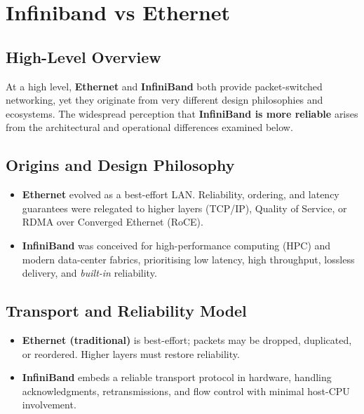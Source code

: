 \section{Infiniband vs Ethernet}

 
 
 \subsection{High-Level Overview}
At a high level, \textbf{Ethernet} and \textbf{InfiniBand} both provide
packet-switched networking, yet they originate from very different
design philosophies and ecosystems.  The widespread perception that
\textbf{InfiniBand is more reliable} arises from the architectural and
operational differences examined below.

\subsection{Origins and Design Philosophy}
\begin{itemize}
  \item \textbf{Ethernet} evolved as a best-effort LAN.  Reliability,
        ordering, and latency guarantees were relegated to higher
        layers (TCP/IP), Quality of Service, or RDMA over Converged
        Ethernet (RoCE).
  \item \textbf{InfiniBand} was conceived for high-performance
        computing (HPC) and modern data-center fabrics, prioritising
        low latency, high throughput, lossless delivery, and
        \emph{built-in} reliability.
\end{itemize}

\subsection{Transport and Reliability Model}
\begin{itemize}
  \item \textbf{Ethernet (traditional)} is best-effort; packets may be
        dropped, duplicated, or reordered.  Higher layers must restore
        reliability.
  \item \textbf{InfiniBand} embeds a reliable transport protocol in
        hardware, handling acknowledgments, retransmissions, and flow
        control with minimal host-CPU involvement.
\end{itemize}

